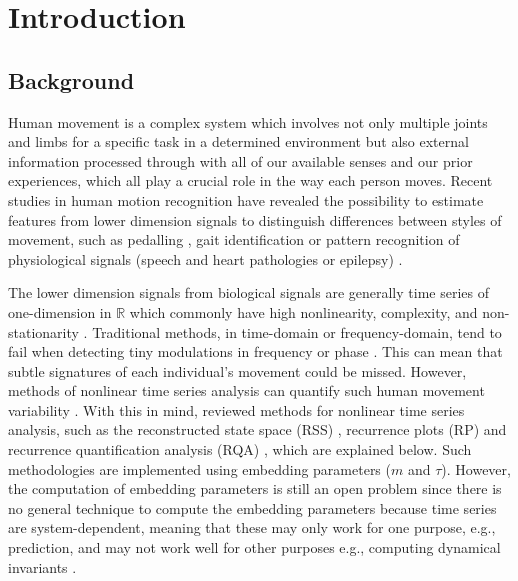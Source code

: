 
\chapter{Introduction}  %


\graphicspath{{figs/chapter1/PDF/}}



\section{Background}
Human movement is a complex system which involves not only multiple
joints and limbs for a specific task in a determined environment
but also external information processed through with all of our available 
senses and our prior experiences, which all play a crucial role in the way 
each person moves.
Recent studies in human motion recognition have revealed the possibility 
to estimate features from lower dimension signals to distinguish differences 
between styles of movement, such as pedalling 
\citep{Quintana-Duque2012, Quintana-Duque2016}, gait identification 
\citep{sama2013, frank2010} or pattern recognition of physiological signals 
(speech and heart pathologies or epilepsy) \citep{gomezgarcia2014}.

The lower dimension signals from biological signals are generally time series 
of one-dimension in $\mathbb{R}$ which commonly have high nonlinearity, 
complexity, and non-stationarity 
\citep{gomezgarcia2014, huffaker2017, caballero2014}.
Traditional methods, in time-domain or frequency-domain, 
tend to fail when detecting tiny modulations in frequency or phase 
\citep{marwan2011}. This can mean that subtle signatures of each 
individual's movement could be missed. However, methods of nonlinear 
time series analysis can quantify such human movement variability 
\citep{Quintana-Duque2012, Quintana-Duque2016, sama2013, 
frank2010, gomezgarcia2014, marwan2011, stergiou2011, packard1980}.
With this in mind, \cite{bradley2015} reviewed methods for
nonlinear time series analysis, such as the reconstructed state space 
(RSS) \citep{takens1981}, recurrence plots (RP) \citep{eckmann1987} and
recurrence quantification analysis (RQA) \citep{zbilut1992}, which are 
explained below.
Such methodologies are implemented using embedding parameters ($m$ and $\tau$).
However, the computation of embedding parameters is still an open problem
since there is no general technique to compute the embedding parameters 
because time series are system-dependent, meaning that these may only work 
for one purpose, e.g., prediction, and may not work well for other purposes
e.g., computing dynamical invariants \citep{bradley2015}.

